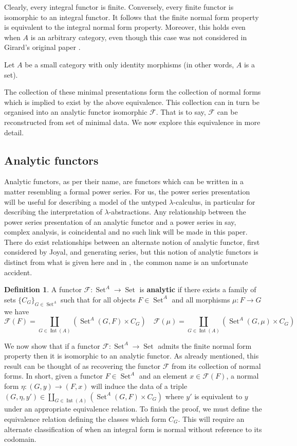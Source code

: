 \documentclass[12pt]{article}
\theoremstyle{plain}
\theoremstyle{definition}
\newtheorem{defn}[thm]{Definition} %
\newcommand{\scr}[1]{\mathscr{#1}}
\newcommand{\lto}{\longrightarrow}
\DeclareMathOperator{\set}{Set}
\begin{document}
Clearly, every integral functor is finite. Conversely, every finite functor is isomorphic to an integral functor. It follows that the finite normal form property is equivalent to the integral normal form property. Moreover, this holds even when $A$ is an arbitrary category, even though this case was not considered in Girard's original paper \cite{Girard}.

Let $A$ be a small category with only identity morphisms (in other words, $A$ is a set).

The collection of these minimal presentations form the collection of normal forms which is implied to exist by the above equivalence. This collection can in turn be organised into an analytic functor isomorphic $\scr{F}$. That is to say, $\scr{F}$ can be reconstructed from set of minimal data. We now explore this equivalence in more detail.

\subsection{Analytic functors}
Analytic functors, as per their name, are functors which can be written in a matter resembling a formal power series. For us, the power series presentation will be useful for describing a model of the untyped $\lambda$-calculus, in particular for describing the interpretation of $\lambda$-abstractions. Any relationship between the power series presentation of an analytic functor and a power series in say, complex analysis, is coincidental and no such link will be made in this paper. There do exist relationships between an alternate notion of analytic functor, first considered by Joyal, and generating series, but this notion of analytic functors is distinct from what is given here and in \cite{Girard}, the common name is an unfortunate accident.

\begin{defn}\label{def:analytic}
		A functor $\scr{F}: \set^A \lto \set$ is \textbf{analytic} if there exists a family of sets $\lbrace C_{G}\rbrace_{G \in \set^A}$ such that for all objects $F \in \set^A$ and all morphisms $\mu: F \lto G$ we have
		\begin{equation*}
			\scr{F}(F) = \coprod_{G \in \operatorname{Int}(A)}(\set^A(G,F) \times C_G)\quad \scr{F}(\mu) = \coprod_{G \in \operatorname{Int}(A)}(\set^A(G,\mu) \times C_G)
			\end{equation*}
		\end{defn}

We now show that if a functor $\scr{F}: \set^A \lto \set$ admits the finite normal form property then it is isomorphic to an analytic functor. As already mentioned, this result can be thought of as recovering the functor $\scr{F}$ from its collection of normal forms. In short, given a functor $F \in \set^A$ and an element $x \in \scr{F}(F)$, a normal form $\eta: (G, y) \lto (F, x)$ will induce the data of a triple $(G, \eta, y') \in \coprod_{G \in \operatorname{Int}(A)}(\set^A(G,F) \times C_G)$ where $y'$ is equivalent to $y$ under an appropriate equivalence relation. To finish the proof, we must define the equivalence relation defining the classes which form $C_G$. This will require an alternate classification of when an integral form is normal without reference to its codomain.
 
\end{document}

